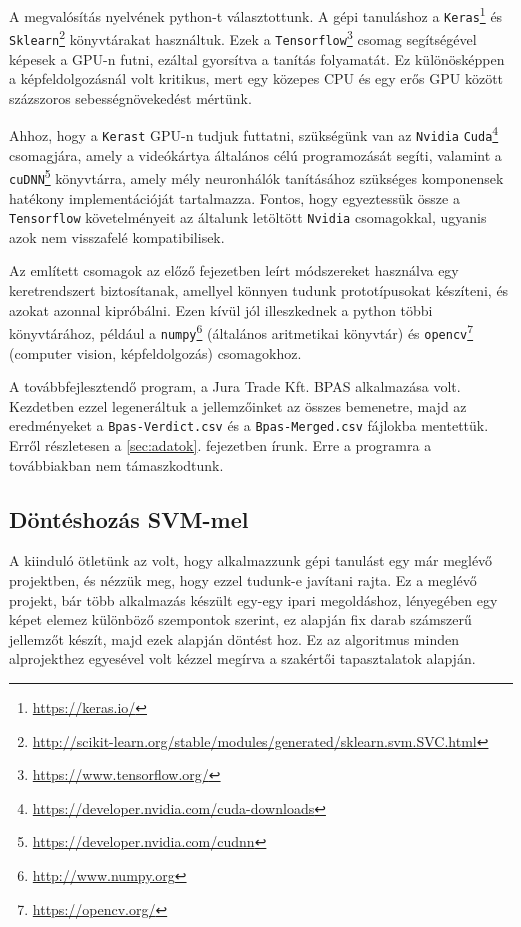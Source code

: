 A megvalósítás nyelvének python-t választottunk.
A gépi tanuláshoz a \texttt{Keras}\footnote{\url{https://keras.io/}} \cite{chollet2015keras} és \texttt{Sklearn}\footnote{\url{http://scikit-learn.org/stable/modules/generated/sklearn.svm.SVC.html}} \cite{pedregosa2011scikit} könyvtárakat 
használtuk. Ezek a \texttt{Tensorflow}\footnote{\url{https://www.tensorflow.org/}} \cite{abadi2016tensorflow} csomag segítségével képesek a
GPU-n futni, ezáltal gyorsítva a tanítás folyamatát. Ez különösképpen a 
képfeldolgozásnál volt kritikus, mert egy közepes CPU és egy erős GPU között
százszoros sebességnövekedést mértünk.

Ahhoz, hogy a \texttt{Kerast} GPU-n tudjuk futtatni, szükségünk van az \texttt{Nvidia}
\texttt{Cuda}\footnote{\url{https://developer.nvidia.com/cuda-downloads}} csomagjára, amely a videókártya általános célú programozását 
segíti, valamint a \texttt{cuDNN}\footnote{\url{https://developer.nvidia.com/cudnn}} könyvtárra, amely mély neuronhálók tanításához 
szükséges komponensek hatékony implementációját tartalmazza. Fontos, hogy egyeztessük
össze a \texttt{Tensorflow} követelményeit az általunk letöltött \texttt{Nvidia} csomagokkal,
ugyanis azok nem visszafelé kompatibilisek.

Az említett csomagok az előző fejezetben leírt módszereket használva egy
keretrendszert biztosítanak, amellyel könnyen tudunk prototípusokat készíteni,
és azokat azonnal kipróbálni. Ezen kívül jól illeszkednek a python többi könyvtárához,
például a \texttt{numpy}\footnote{\url{http://www.numpy.org}} (általános aritmetikai könyvtár) és \texttt{opencv}\footnote{\url{https://opencv.org/}}
(computer vision, képfeldolgozás) csomagokhoz.


A továbbfejlesztendő program, a Jura Trade Kft. BPAS alkalmazása volt. Kezdetben ezzel legeneráltuk
a jellemzőinket az összes bemenetre, majd az eredményeket a \texttt{Bpas-Verdict.csv} és
a \texttt{Bpas-Merged.csv} fájlokba mentettük. Erről részletesen a \ref{sec:adatok}.
fejezetben írunk. Erre a programra a továbbiakban nem támaszkodtunk.



\subsection{Döntéshozás SVM-mel}

A kiinduló ötletünk az volt, hogy alkalmazzunk gépi tanulást egy már meglévő projektben,
és nézzük meg, hogy ezzel tudunk-e javítani rajta. Ez a meglévő projekt, bár több 
alkalmazás készült egy-egy ipari megoldáshoz, lényegében egy képet elemez 
különböző szempontok szerint, ez alapján fix darab számszerű jellemzőt készít, 
majd ezek alapján döntést hoz. Ez az algoritmus minden alprojekthez egyesével
volt kézzel megírva a szakértői tapasztalatok alapján. 

